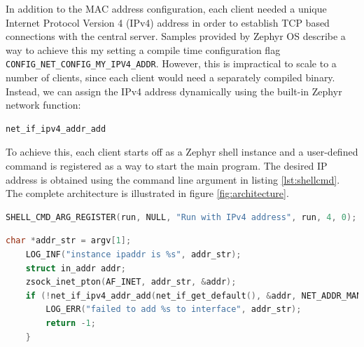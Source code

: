 \documentclass[12pt]{article}
\begin{document}
In addition to the MAC address configuration, each client needed a unique Internet Protocol Version
4 (IPv4) address in order to establish TCP based connections with the central server. Samples
provided by Zephyr OS describe a way to achieve this my setting a compile time configuration flag\\
\verb|CONFIG_NET_CONFIG_MY_IPV4_ADDR|. However, this is impractical to scale to a number of clients, since
each client would need a separately compiled binary. Instead, we can assign the IPv4 address
dynamically using the built-in Zephyr network function:
\begin{verbatim}
net_if_ipv4_addr_add
\end{verbatim}
To achieve this, each client starts off as a Zephyr shell instance and a user-defined command is registered as a way to start the main program.
The desired IP address is obtained using the command line argument in listing \ref{lst:shellcmd}.
The complete architecture is illustrated in figure \ref{fig:architecture}.

\begin{lstlisting}[language=C, caption=Registering user defined command "run" to the function
pointer run,label={lst:shellcmd}]
SHELL_CMD_ARG_REGISTER(run, NULL, "Run with IPv4 address", run, 4, 0);
\end{lstlisting}

\begin{lstlisting}[language=C, caption=the "run" function which performs IP address assignment at runtime]
    char *addr_str = argv[1];
    LOG_INF("instance ipaddr is %s", addr_str);
    struct in_addr addr;
    zsock_inet_pton(AF_INET, addr_str, &addr);
    if (!net_if_ipv4_addr_add(net_if_get_default(), &addr, NET_ADDR_MANUAL, UINT32_MAX)) {
        LOG_ERR("failed to add %s to interface", addr_str);
        return -1;
    }
\end{lstlisting}
\end{document}
